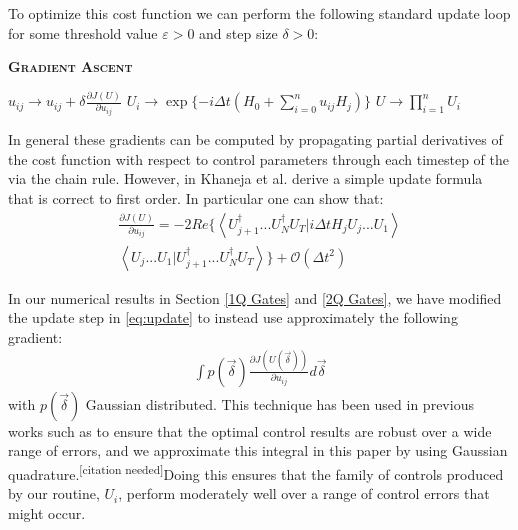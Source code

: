\documentclass[aps,nofootinbib,pra,notitlepage,twocolumn]{revtex4-1}
\newcommand{\braket}[2]{\left\langle #1 | #2 \right\rangle}
\newcommand{\needcite}{{\color{blue}\textsuperscript{[citation needed]}}}
\begin{document}
To optimize this cost function we can perform the following standard update loop for some threshold value $\varepsilon > 0$ and step size $\delta > 0$:
\begin{algorithm}[H]
  \caption{\textsc{\textbf{Gradient Ascent}}}
  \begin{algorithmic}
    \State $u_{ij} \rightarrow u_{ij} + \delta\frac{\partial J(U)}{\partial u_{ij}}$
    \State $U_i \rightarrow \exp\{-i\Delta t(H_0 + \sum_{i=0}^{n}u_{ij}H_j)\}$
    \EndFor
    \State $U \rightarrow \prod_{i=1}^nU_i$
    \EndWhile 
  \end{algorithmic}
\end{algorithm}

In general these gradients can be computed by propagating partial derivatives of the cost function with respect to control parameters through each timestep of the  via the chain rule. However, in \cite{Khaneja2005} Khaneja et al. derive a simple update formula that is correct to first order. In particular one can show that:
\begin{equation}\label{eq:update}
  \begin{split}
\frac{\partial J(U)}{\partial u_{ij}} = -2Re\{\braket{{U_{j+1}^{\dagger}...U_N^{\dagger} U_T}}{i\Delta tH_jU_j...U_1}\\
\braket{U_j...U_1}{U_{j+1}^{\dagger}...U_N^{\dagger} U_T}\} +  \mathcal{O}(\Delta t^2)
  \end{split}
\end{equation}


In our numerical results in Section \ref{1Q Gates} and \ref{2Q Gates}, we have modified the update step in \ref{eq:update} to instead use approximately the following gradient:
\begin{align}\label{quadrature}
\int p(\vec{\delta})\frac{\partial J(U(\vec{\delta}))}{\partial u_{ij}} d\vec{\delta}
\end{align}
with $p(\vec{\delta})$ Gaussian distributed. This technique has been used in previous works such as \cite{Goerz2014} to ensure that the optimal control results are robust over a wide range of errors, and we approximate this integral in this paper by using Gaussian quadrature.\needcite Doing this ensures that the family of controls produced by our routine, $U_i$, perform moderately well over a range of control errors that might occur.
\end{document}
